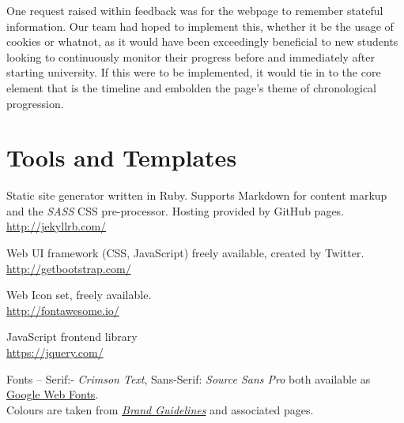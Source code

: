\documentclass[a4paper, notoc]{tufte-handout}
\let\origdescription\description
\renewenvironment{description}{
  \setlength{\leftmargini}{1.5em}
  \origdescription
  \setlength{\itemindent}{-1.5em}
  \setlength{\labelsep}{\textwidth}
}
{\endlist}
\begin{document}
One request raised within feedback was for the webpage to remember stateful information. Our team had hoped to implement this, whether it be the usage of cookies or whatnot, as it would have been exceedingly beneficial to new students looking to continuously monitor their progress before and immediately after starting university. If this were to be implemented, it would tie in to the core element that is the timeline and embolden the page's theme of chronological progression.


\section{Tools and Templates}


\begin{description}

\item[Jekyll]
Static site generator written in Ruby. Supports Markdown for 
content markup and the \textit{SASS} CSS pre-processor.
Hosting provided by GitHub pages.
\\
\href{http://jekyllrb.com/}{http://jekyllrb.com/}

\item[BootStrap]
Web UI framework (CSS, JavaScript) freely available, created by Twitter.
\\
\href{http://getbootstrap.com/}{http://getbootstrap.com/}

\item[FontAwesome]
Web Icon set, freely available.
\\
\href{http://fontawesome.io/}{http://fontawesome.io/}


\item[JQuery]
JavaScript frontend library
\\
\href{https://jquery.com/}{https://jquery.com/}

\item[University of Edinburgh Style Guide]
Fonts -- Serif:- \textit{Crimson Text}, Sans-Serif: \textit{Source Sans Pro} both 
available as \href{https://fonts.google.com/}{Google Web Fonts}.
\\
Colours are taken from 
\href{http://www.ed.ac.uk/communications-marketing/resources}{\textit{Brand Guidelines}} 
and associated pages.
\\



\end{description}
\end{document}
